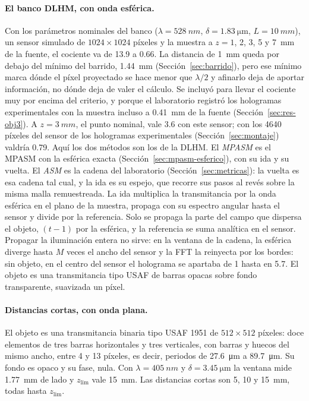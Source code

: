 \paragraph{El banco DLHM, con onda esférica.} Con los parámetros nominales del
banco ($\lambda = \SI{528}{nm}$, $\delta = \SI{1.83}{\micro\metre}$,
$L = \SI{10}{mm}$), un sensor simulado de $1024\times1024$ píxeles y la
muestra a $z = 1$, 2, 3, 5 y \SI{7}{mm} de la fuente, el cociente va de 13.9 a
0.66. La distancia de \SI{1}{mm} queda por debajo del mínimo del barrido,
\SI{1.44}{mm} (Sección~\ref{sec:barrido}), pero ese mínimo marca dónde el
píxel proyectado se hace menor que $\lambda/2$ y afinarlo deja de aportar
información, no dónde deja de valer el cálculo. Se incluyó para llevar el
cociente muy por encima del criterio, y porque el laboratorio registró los
hologramas experimentales con la muestra incluso a \SI{0.41}{mm} de la fuente
(Sección~\ref{sec:res-obj3}). A $z = \SI{3}{mm}$, el punto nominal, vale 3.6 con este sensor; con
los 4640 píxeles del sensor de los hologramas experimentales
(Sección~\ref{sec:montaje}) valdría 0.79. Aquí los dos métodos son los de la
DLHM. El \emph{MPASM} es el MPASM con la esférica exacta
(Sección~\ref{sec:mpasm-esferico}), con su ida y su vuelta. El \emph{ASM} es
la cadena del laboratorio (Sección~\ref{sec:metricas}): la vuelta es esa
cadena tal cual, y la ida es su espejo, que recorre sus pasos al revés
sobre la misma malla remuestreada. La ida multiplica la transmitancia por la
onda esférica en el plano de la muestra, propaga con su espectro angular hasta
el sensor y divide por la referencia. Solo se propaga la parte del campo que
dispersa el objeto, $(t - 1)$ por la esférica, y la referencia se suma
analítica en el sensor. Propagar la iluminación entera no sirve: en la
ventana de la cadena, la esférica diverge hasta $M$ veces el ancho del
sensor y la FFT la reinyecta por los bordes: sin objeto, en el centro del
sensor el holograma se apartaba de 1 hasta en 5.7. El objeto es una transmitancia tipo USAF de
barras opacas sobre fondo transparente, suavizada un píxel.

\paragraph{Distancias cortas, con onda plana.} El objeto es una transmitancia
binaria tipo USAF 1951 de $512\times512$ píxeles: doce elementos de tres
barras horizontales y tres verticales, con barras y huecos del mismo ancho,
entre 4 y 13 píxeles, es decir, periodos de \SI{27.6}{\micro\metre} a
\SI{89.7}{\micro\metre}. Su fondo es opaco y su fase, nula. Con
$\lambda = \SI{405}{nm}$ y $\delta = \SI{3.45}{\micro\metre}$ la ventana mide
\SI{1.77}{mm} de lado y $z_\mathrm{lim}$ vale \SI{15}{mm}. Las distancias
cortas son 5, 10 y \SI{15}{mm}, todas hasta $z_\mathrm{lim}$.


